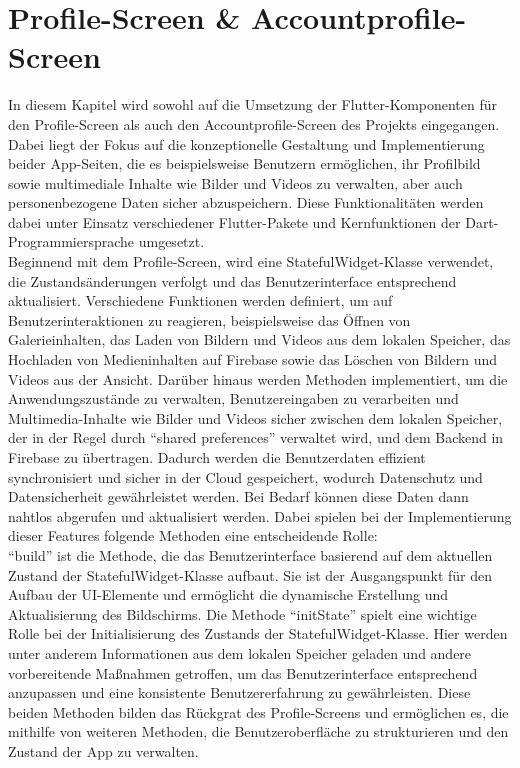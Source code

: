 \chapter{Profile-Screen \& Accountprofile-Screen}
In diesem Kapitel wird sowohl auf die Umsetzung der Flutter-Komponenten für den Profile-Screen als auch den Accountprofile-Screen des Projekts eingegangen.
Dabei liegt der Fokus auf die konzeptionelle Gestaltung und Implementierung beider App-Seiten, die es beispielsweise Benutzern ermöglichen, ihr Profilbild sowie multimediale Inhalte wie Bilder und Videos zu verwalten, aber auch personenbezogene Daten sicher abzuspeichern. 
Diese Funktionalitäten werden dabei unter Einsatz verschiedener Flutter-Pakete und Kernfunktionen der Dart-Programmiersprache umgesetzt. 
\\
Beginnend mit dem Profile-Screen, wird eine StatefulWidget-Klasse verwendet, die Zustandsänderungen verfolgt und das Benutzerinterface entsprechend aktualisiert.
Verschiedene Funktionen werden definiert, um auf Benutzerinteraktionen zu reagieren, beispielsweise das Öffnen von Galerieinhalten, das Laden von Bildern und Videos aus dem lokalen Speicher, das Hochladen von Medieninhalten auf Firebase sowie das Löschen von Bildern und Videos aus der Ansicht.
Darüber hinaus werden Methoden implementiert, um die Anwendungszustände zu verwalten, Benutzereingaben zu verarbeiten und Multimedia-Inhalte wie Bilder und Videos sicher zwischen dem lokalen Speicher, der in der Regel durch ``shared preferences'' verwaltet wird, und dem Backend in Firebase zu übertragen. 
Dadurch werden die Benutzerdaten effizient synchronisiert und sicher in der Cloud gespeichert, wodurch Datenschutz und Datensicherheit gewährleistet werden. 
Bei Bedarf können diese Daten dann nahtlos abgerufen und aktualisiert werden. Dabei spielen bei der Implementierung dieser Features folgende Methoden eine entscheidende Rolle:
\\``build'' ist die Methode, die das Benutzerinterface basierend auf dem aktuellen Zustand der StatefulWidget-Klasse aufbaut. Sie ist der Ausgangspunkt für den Aufbau der UI-Elemente und ermöglicht die dynamische Erstellung und Aktualisierung des Bildschirms. 
Die Methode ``initState'' spielt eine wichtige Rolle bei der Initialisierung des Zustands der StatefulWidget-Klasse. Hier werden unter anderem Informationen aus dem lokalen Speicher geladen und andere vorbereitende Maßnahmen getroffen, um das Benutzerinterface entsprechend anzupassen und eine konsistente Benutzererfahrung zu gewährleisten. 
Diese beiden Methoden bilden das Rückgrat des Profile-Screens und ermöglichen es, die mithilfe von weiteren Methoden, die Benutzeroberfläche zu strukturieren und den Zustand der App zu verwalten.
